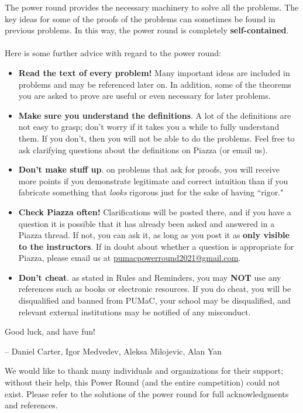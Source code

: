 \documentclass[11pt]{article}
\begin{document}
The power round provides the necessary machinery to solve all the problems. The key ideas for some of the proofs of the problems can sometimes be found in previous problems. In this way, the power round is completely \textbf{self-contained}. \\
\\
Here is some further advice with regard to the power round:
\begin{itemize}
    \item \textbf{Read the text of every problem!} Many important ideas are included in problems and may be referenced later on. In addition, some of the theorems you are asked to prove are useful or even necessary for later problems. 
    \item \textbf{Make sure you understand the definitions}. A lot of the definitions are not easy to grasp; don't worry if it takes you a while to fully understand them. If you don't, then you will not be able to do the problems. Feel free to ask clarifying questions about the definitions on Piazza (or email us).
    \item \textbf{Don't make stuff up}. on problems that ask for proofs, you will receive more points if you demonstrate legitimate and correct intuition than if you fabricate something that \emph{looks} rigorous just for the sake of having ``rigor." 
    \item \textbf{Check Piazza often!} Clarifications will be posted there, and if you have a question it is possible that it has already been asked and answered in a Piazza thread. If not, you can ask it, as long as you post it as \textbf{only visible to the instructors}. If in doubt about whether a question is appropriate for Piazza, please email us at \href{mailto:pumacpowerround2021@gmail.com}{pumacpowerround2021@gmail.com}.
    \item \textbf{Don't cheat}. as stated in Rules and Reminders, you may \textbf{NOT} use any references such as books or electronic resources. If you do cheat, you will be disqualified and banned from PUMaC, your school may be disqualified, and relevant external institutions may be notified of any misconduct.

\end{itemize}

Good luck, and have fun!
\begin{flushright}-- Daniel Carter, Igor Medvedev, Aleksa Milojevic, Alan Yan\end{flushright}

We would like to thank many individuals and organizations for their support; without their help, this Power Round (and the entire competition) could not exist. Please refer to the solutions of the power round for full acknowledgments and references.
\end{document}
